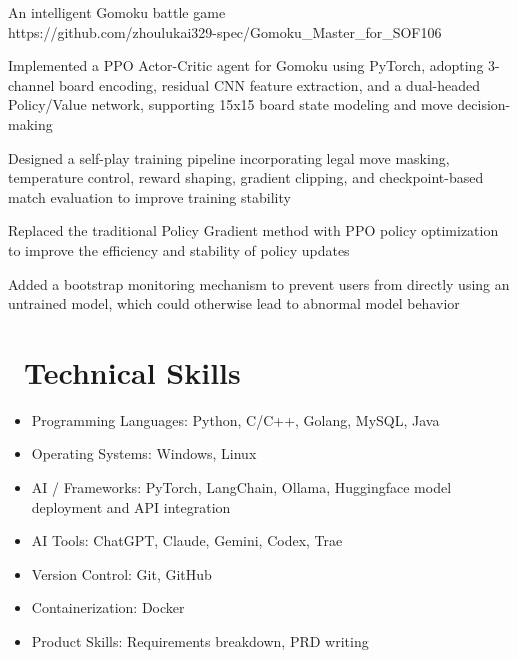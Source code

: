 \documentclass{resume}
\begin{document}
\begin{onehalfspacing}
An intelligent Gomoku battle game
\\https://github.com/zhoulukai329-spec/Gomoku\_Master\_for\_SOF106
\begin{projectitems}
  \item Implemented a PPO Actor-Critic agent for Gomoku using PyTorch, adopting 3-channel board encoding, residual CNN feature extraction, and a dual-headed Policy/Value network, supporting 15x15 board state modeling and move decision-making
  \item Designed a self-play training pipeline incorporating legal move masking, temperature control, reward shaping, gradient clipping, and checkpoint-based match evaluation to improve training stability
  \item Replaced the traditional Policy Gradient method with PPO policy optimization to improve the efficiency and stability of policy updates
  \item Added a bootstrap monitoring mechanism to prevent users from directly using an untrained model, which could otherwise lead to abnormal model behavior
\end{projectitems}
\end{onehalfspacing}



\section{\texorpdfstring{{\normalfont\faCogs}\ }{}Technical Skills}
\begin{itemize}[parsep=0.5ex]
  \item Programming Languages: Python, C/C++, Golang, MySQL, Java
  \item Operating Systems: Windows, Linux
  \item AI / Frameworks: PyTorch, LangChain, Ollama, Huggingface model deployment and API integration
  \item AI Tools: ChatGPT, Claude, Gemini, Codex, Trae
  \item Version Control: Git, GitHub
  \item Containerization: Docker
  \item Product Skills: Requirements breakdown, PRD writing
\end{itemize}
\end{document}
